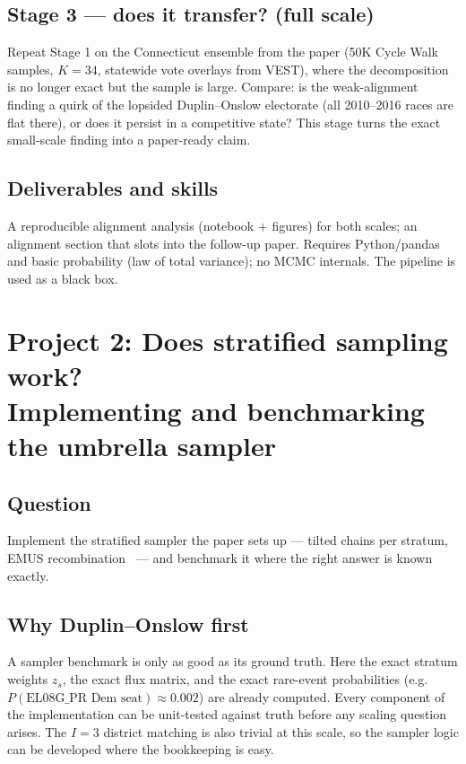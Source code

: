 \documentclass[11pt]{article}
\begin{document}
\subsection*{Stage 3 --- does it transfer? (full scale)}

Repeat Stage 1 on the Connecticut ensemble from the paper (50K Cycle
Walk samples, $K=34$, statewide vote overlays from VEST), where the
decomposition is no longer exact but the sample is large. Compare: is
the weak-alignment finding a quirk of the lopsided Duplin--Onslow
electorate (all 2010--2016 races are flat there), or does it persist
in a competitive state? This stage turns the exact small-scale finding
into a paper-ready claim.

\subsection*{Deliverables and skills}

A reproducible alignment analysis (notebook + figures) for both
scales; an alignment section that slots into the follow-up paper.
Requires Python/pandas and basic probability (law of total variance);
no MCMC internals. The pipeline is used as a black box.

\section{Project 2: Does stratified sampling work?\\
\normalsize Implementing and benchmarking the umbrella sampler}

\subsection*{Question}

Implement the stratified sampler the paper sets up --- tilted chains
per stratum, EMUS recombination~\cite{thiede2016,dinner2020} --- and
benchmark it where the right answer is known exactly.

\subsection*{Why Duplin--Onslow first}

A sampler benchmark is only as good as its ground truth. Here the
exact stratum weights $z_s$, the exact flux matrix, and the exact
rare-event probabilities (e.g.\ $P(\text{EL08G\_PR Dem seat}) \approx
0.002$) are already computed. Every component of the implementation
can be unit-tested against truth before any scaling question arises.
The $I=3$ district matching is also trivial at this scale, so the
sampler logic can be developed where the bookkeeping is easy.
\end{document}
